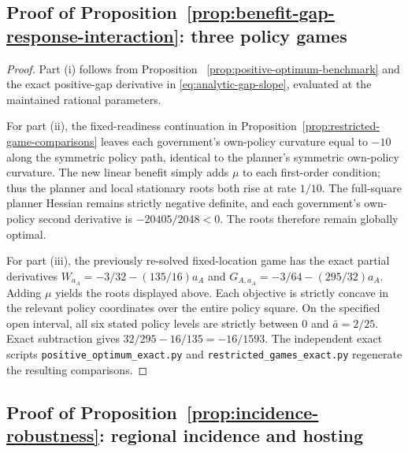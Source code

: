 \subsection{Proof of Proposition~\ref{prop:benefit-gap-response-interaction}: three policy games}\label{app:jpet-additional-proof-3}

\begin{proof}
Part (i) follows from Proposition~
\ref{prop:positive-optimum-benchmark} and the exact
positive-gap derivative in
\eqref{eq:analytic-gap-slope}, evaluated at the
maintained rational parameters.

For part (ii), the fixed-readiness continuation in
Proposition~\ref{prop:restricted-game-comparisons}
leaves each government's own-policy curvature equal
to $-10$ along the symmetric policy path, identical
to the planner's symmetric own-policy curvature.
The new linear benefit simply adds $\mu$ to each
first-order condition; thus the planner and local
stationary roots both rise at rate $1/10$.
The full-square planner Hessian remains strictly
negative definite, and each government's own-policy
second derivative is $-20405/2048<0$.
The roots therefore remain globally optimal.

For part (iii), the previously re-solved fixed-location
game has the exact partial derivatives
$W_{a_A}=-3/32-(135/16)a_A$ and
$G_{A,a_A}=-3/64-(295/32)a_A$.
Adding $\mu$ yields the roots displayed above.
Each objective is strictly concave in the relevant
policy coordinates over the entire policy square.
On the specified open interval, all six stated
policy levels are strictly between $0$ and
$\bar a=2/25$. Exact subtraction gives
$32/295-16/135=-16/1593$.
The independent exact scripts
\texttt{positive\_optimum\_exact.py} and
\texttt{restricted\_games\_exact.py}
regenerate the resulting comparisons.
\end{proof}

\subsection{Proof of Proposition~\ref{prop:incidence-robustness}: regional incidence and hosting}\label{app:jpet-additional-proof-4}


